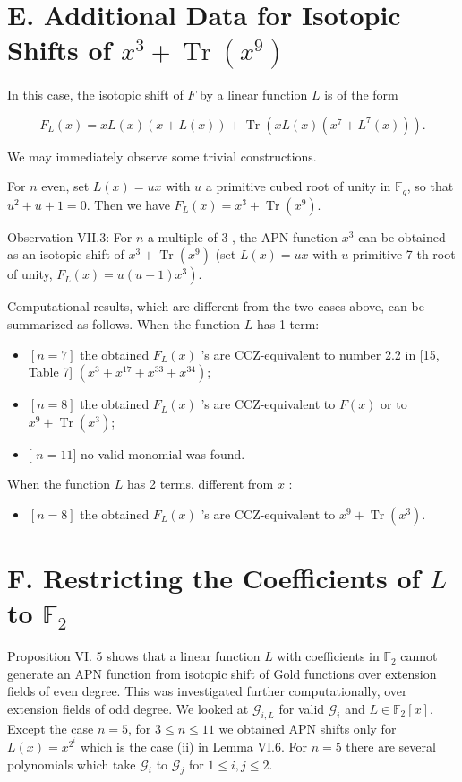 \documentclass[10pt]{article}
\begin{document}
\section*{E. Additional Data for Isotopic Shifts of $x^{3}+\operatorname{Tr}\left(x^{9}\right)$}
In this case, the isotopic shift of $F$ by a linear function $L$ is of the form


\begin{equation*}
F_{L}(x)=x L(x)(x+L(x))+\operatorname{Tr}\left(x L(x)\left(x^{7}+L^{7}(x)\right)\right) . \tag{18}
\end{equation*}


We may immediately observe some trivial constructions.

For $n$ even, set $L(x)=u x$ with $u$ a primitive cubed root of unity in $\mathbb{F}_{q}$, so that $u^{2}+u+1=0$. Then we have $F_{L}(x)= x^{3}+\operatorname{Tr}\left(x^{9}\right)$.

Observation VII.3: For $n$ a multiple of 3 , the APN function $x^{3}$ can be obtained as an isotopic shift of $x^{3}+\operatorname{Tr}\left(x^{9}\right)$ (set $L(x)=u x$ with $u$ primitive 7-th root of unity, $F_{L}(x)= \left.u(u+1) x^{3}\right)$.

Computational results, which are different from the two cases above, can be summarized as follows. When the function $L$ has 1 term:

\begin{itemize}
  \item $[n=7]$ the obtained $F_{L}(x)$ 's are CCZ-equivalent to number 2.2 in [15, Table 7] $\left(x^{3}+x^{17}+x^{33}+x^{34}\right)$;
  \item $[n=8]$ the obtained $F_{L}(x)$ 's are CCZ-equivalent to $F(x)$ or to $x^{9}+\operatorname{Tr}\left(x^{3}\right)$;
  \item \hspace{0pt} [ $n=11]$ no valid monomial was found.
\end{itemize}

When the function $L$ has 2 terms, different from $x$ :

\begin{itemize}
  \item $[n=8]$ the obtained $F_{L}(x)$ 's are CCZ-equivalent to $x^{9}+ \operatorname{Tr}\left(x^{3}\right)$.
\end{itemize}

\section*{F. Restricting the Coefficients of $L$ to $\mathbb{F}_{2}$}
Proposition VI. 5 shows that a linear function $L$ with coefficients in $\mathbb{F}_{2}$ cannot generate an APN function from isotopic shift of Gold functions over extension fields of even degree. This was investigated further computationally, over extension fields of odd degree. We looked at $\mathcal{G}_{i, L}$ for valid $\mathcal{G}_{i}$ and $L \in \mathbb{F}_{2}[x]$. Except the case $n=5$, for $3 \leq n \leq 11$ we obtained APN shifts only for $L(x)=x^{2^{i}}$ which is the case (ii) in Lemma VI.6. For $n=5$ there are several polynomials which take $\mathcal{G}_{i}$ to $\mathcal{G}_{j}$ for $1 \leq i, j \leq 2$.
\end{document}
